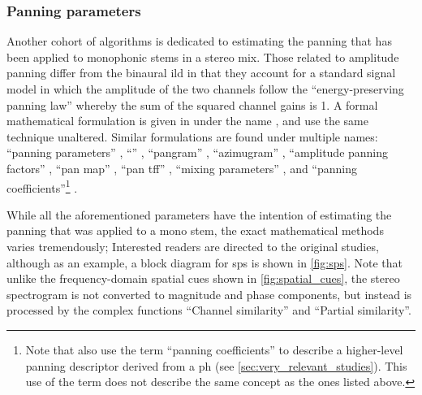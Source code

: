 \documentclass[referee,pdflatex,sn-mathphys-num]{sn-jnl}%
\newcommand{\q}[1]{\enquote{#1}}
\begin{document}
\subsubsection{Panning parameters}
\label{sec:panning_parameters}

Another cohort of algorithms is dedicated to estimating the panning that has been applied to monophonic stems in a stereo mix. Those related to amplitude panning differ from the binaural \gls{ild} in that they account for a standard signal model in which the amplitude of the two channels follow the \q{energy-preserving panning law} whereby the sum of the squared channel gains is 1. A formal mathematical formulation is given in \cite{avendanoFrequencyDomainTechniques2002,avendanoFrequencydomainSourceIdentification2003,avendanoFrequencydomainApproachMultichannel2004} under the name , and \cite{breebaartMultiLoudspeakerPlaybackStereo2007,cobosSingingVoiceSeparation2008,drossosStereoGoesMobile2012} use the same technique unaltered. Similar formulations are found under multiple names: \q{panning parameters} \cite{hansenEstimationFundamentalFrequencies2019,defreinRemedyingSoundSource2020,defreinReformulatingBinaryMasking2020}, \q{} \cite{tzanetakisStereoPanningFeatures2007}, \q{pangram} \cite{harmaSpatialDecompositionTimefrequency2004}, \q{azimugram} \cite{barryMusicStructureSegmentation2007,sofianosEffectiveSingingVoice2010}, \q{amplitude panning factors} \cite{fallerMultipleloudspeakerPlaybackStereo2006}, \q{pan map} \cite{cobosStereoAudioSource2008}, \q{pan \gls{tff}} \cite{razzaqAdvancedDSPAlgorithm2016}, \q{mixing parameters} \cite{woodruffRemixingStereoMusic2006,woodruffUsingPitchAmplitude2006}, and \q{panning coefficients}\footnote{Note that \cite{gomezMusicSimilaritySystems2008,guausAudioContentProcessing2009} also use the term \q{panning coefficients} to describe a higher-level panning descriptor derived from a \gls{ph} (see \cref{sec:very_relevant_studies}). This use of the term does not describe the same concept as the ones listed above.} \cite{liUnsupervisedAdaptiveFiltering2005,chunFrequencydependentAmplitudePanning2016,miethObjectiveEvaluationTechniques2017,cabanas-moleroMusicDemixingMachine2023}.

While all the aforementioned parameters have the intention of estimating the panning that was applied to a mono stem, the exact mathematical methods varies tremendously; Interested readers are directed to the original studies, although as an example, a block diagram for \gls{sps} \cite{tzanetakisStereoPanningFeatures2007} is shown in \cref{fig:sps}. Note that unlike the frequency-domain spatial cues shown in \cref{fig:spatial_cues}, the stereo spectrogram is not converted to magnitude and phase components, but instead is processed by the complex functions \q{Channel similarity} and \q{Partial similarity}.
\end{document}
